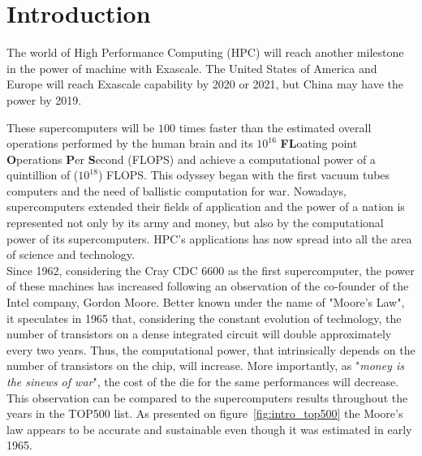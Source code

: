 \chapter*{Introduction}

The world of High Performance Computing (HPC) will reach another milestone in the power of machine with Exascale. 
The United States of America and Europe will reach Exascale capability by 2020 or 2021, but China may have the power by 2019. 

These supercomputers will be $100$ times faster than the estimated overall operations performed by the human brain and its $10^{16}$ \textbf{FL}oating point \textbf{O}perations \textbf{P}er \textbf{S}econd (FLOPS) \cite{kurzweil2010singularity} and achieve a computational power of a quintillion of ($10^{18}$) FLOPS.
This odyssey began with the first vacuum tubes computers and the need of ballistic computation for war. 
Nowadays, supercomputers extended their fields of application and the power of a nation is represented not only by its army and money, but also by the computational power of its supercomputers.
HPC's applications has now spread into all the area of science and technology.\\

Since 1962, considering the Cray CDC 6600 as the first supercomputer, the power of these machines has increased following an observation of the co-founder of the Intel company, Gordon Moore. 
Better known under the name of "Moore's Law", it speculates in 1965 that, considering the constant evolution of technology, the number of transistors on a dense integrated circuit will double approximately every two years. 
Thus, the computational power, that intrinsically depends on the number of transistors on the chip, will increase.
More importantly, as "\textit{money is the sinews of war}", the cost of the die for the same performances will decrease.  
This observation can be compared to the supercomputers results throughout the years in the TOP500 list. 
As presented on figure~\ref{fig:intro_top500} the Moore's law appears to be accurate and sustainable even though it was estimated in early 1965. 

